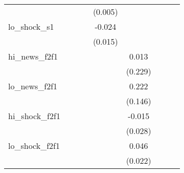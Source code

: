 {\begin{tabular}{l*{8}{c}}
            &                     &                     &                     &     (0.005)         &                     &                     &                     &                     \\
\addlinespace
lo\_shock\_s1 &                     &                     &                     &      -0.024         &                     &                     &                     &                     \\
            &                     &                     &                     &     (0.015)         &                     &                     &                     &                     \\
\addlinespace
hi\_news\_f2f1&                     &                     &                     &                     &       0.013         &                     &                     &                     \\
            &                     &                     &                     &                     &     (0.229)         &                     &                     &                     \\
\addlinespace
lo\_news\_f2f1&                     &                     &                     &                     &       0.222         &                     &                     &                     \\
            &                     &                     &                     &                     &     (0.146)         &                     &                     &                     \\
\addlinespace
hi\_shock\_f2f1&                     &                     &                     &                     &      -0.015         &                     &                     &                     \\
            &                     &                     &                     &                     &     (0.028)         &                     &                     &                     \\
\addlinespace
lo\_shock\_f2f1&                     &                     &                     &                     &       0.046\sym{**} &                     &                     &                     \\
            &                     &                     &                     &                     &     (0.022)         &                     &                     &                     \\

\end{tabular}}
